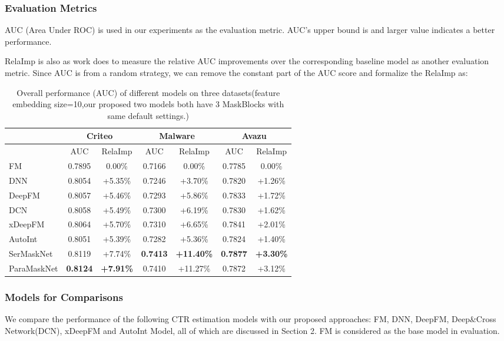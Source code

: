 \documentclass[sigconf]{acmart}
\begin{document}
\subsubsection{Evaluation Metrics}
AUC (Area Under ROC) is used in our experiments as the evaluation metric. AUC's upper bound is  and larger value indicates a better performance.


RelaImp is also as work \cite{inproceedings} does to measure the relative AUC improvements over the corresponding baseline model as another evaluation metric. Since AUC is  from a random strategy, we can remove the constant part of the AUC score and formalize the RelaImp as:


\begin{table*}
  \setlength{\abovecaptionskip}{1pt}
\centering
\caption{Overall performance (AUC) of different models on three datasets(feature embedding size=10,our proposed two models  both have 3 MaskBlocks  with same default settings.)}
\begin{tabular}{l|cccccc}
\toprule
  & \multicolumn{2}{c}{\textbf{Criteo}} &
  \multicolumn{2}{c}{\textbf{Malware}} & \multicolumn{2}{c}{\textbf{Avazu}} \\
\midrule
  & AUC & RelaImp   & AUC & RelaImp  & AUC & RelaImp \\
\midrule
FM & 0.7895 & 0.00\% & 0.7166 & 0.00\% & 0.7785 & 0.00\%\\
DNN & 0.8054 & +5.35\% & 0.7246 & +3.70\% & 0.7820 & +1.26\%\\
DeepFM & 0.8057 & +5.46\% & 0.7293 & +5.86\% & 0.7833 & +1.72\%\\
\midrule

DCN & 0.8058 & +5.49\% & 0.7300 & +6.19\% & 0.7830 & +1.62\%\\
xDeepFM & 0.8064 & +5.70\% & 0.7310 & +6.65\% & 0.7841 & +2.01\%\\
AutoInt & 0.8051 & +5.39\% & 0.7282 & +5.36\% & 0.7824 & +1.40\%\\
\midrule
SerMaskNet & 0.8119 & +7.74\% & \textbf{0.7413} & \textbf{+11.40\%} & \textbf{0.7877} & \textbf{+3.30\%}\\
ParaMaskNet & \textbf{0.8124} & \textbf{+7.91\%} & 0.7410 & +11.27\% & 0.7872 & +3.12\%\\
\bottomrule
\end{tabular}\label{tab:overalperformance}
\end{table*}

\subsubsection{Models for Comparisons}
We compare the performance of the following CTR estimation models with our proposed approaches: FM, DNN, DeepFM, Deep\&Cross Network(DCN), xDeepFM and AutoInt Model, all of which are discussed in Section 2. FM is considered as the base model in evaluation.
\end{document}
